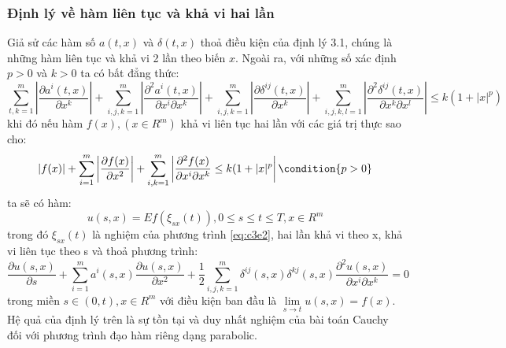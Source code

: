 \documentclass[14pt,a4paper]{article}
\numberwithin{equation}{section}
\begin{document}
\subsubsection{Định lý về hàm liên tục và khả vi hai lần}
Giả sử các hàm số $a(t,x)$ và $\delta(t,x)$ thoả điều kiện của định lý 3.1, chúng là những hàm liên tục và khả vi 2 lần theo biến $x$. Ngoài ra, với những số xác định $p>0$ và $k>0$ ta có bất đẳng thức:
\begin{dmath*}
	\sum\limits_{t,k=1}^{m}\left|\dfrac{\partial a^i(t,x)}{\partial x^k}\right|+\sum\limits_{i,j,k=1}^{m}\left|\dfrac{\partial^2a^i(t,x)}{\partial x^i\partial x^k}\right|+\sum_{i,j,k=1}^{m}\left|\dfrac{\partial\delta^{ij}(t,x)}{\partial x^k} \right|+\sum_{i,j,k,l=1}^{m}\left|\dfrac{\partial^2\delta^{ij}(t,x)}{\partial x^k\partial x^l} \right|\leq k(1+|x|^p)	
\end{dmath*}
khi đó nếu hàm $f(x),(x\in R^m)$ khả vi liên tục hai lần với các giá trị thực sao cho:
\begin{equation*}
	\left|f(x)\right|+\sum_{i=1}^{m}\left|\dfrac{\partial f(x)}{\partial x^2} \right|+\sum_{i,k=1}^{m}\left|\dfrac{\partial^2f(x)}{\partial x^i \partial x^k}\leq k(1+|x|^p \right| \condition{p>0}
\end{equation*}
ta sẽ có hàm:
\begin{equation*}
	u(s,x)=Ef(\xi_{sx}(t)),0\leq s\leq t \leq T,x\in R^m
\end{equation*}
trong đó $\xi_{sx}(t)$ là nghiệm của phương trình \eqref{eq:c3e2}, hai lần khả vi theo x, khả vi liên tục theo s và thoả phương trình:
\begin{equation*}
	\dfrac{\partial u(s,x)}{\partial s}+\sum_{i=1}^{m}a^i(s,x)\dfrac{\partial u(s,x)}{\partial x^2}+\dfrac{1}{2}\sum_{i,j,k=1}^{m}\delta^{ij}(s,x)\delta^{kj}(s,x)\dfrac{\partial^2u(s,x)}{\partial x^i\partial x^k}=0
\end{equation*}
trong miền $s\in(0,t),x\in R^m$ với điều kiện ban đầu là $\lim\limits_{s\rightarrow t}u(s,x)=f(x)$.\\
Hệ quả của định lý trên là sự tồn tại và duy nhất nghiệm của bài toán Cauchy đối với phương trình đạo hàm riêng dạng parabolic.\\
\end{document}
